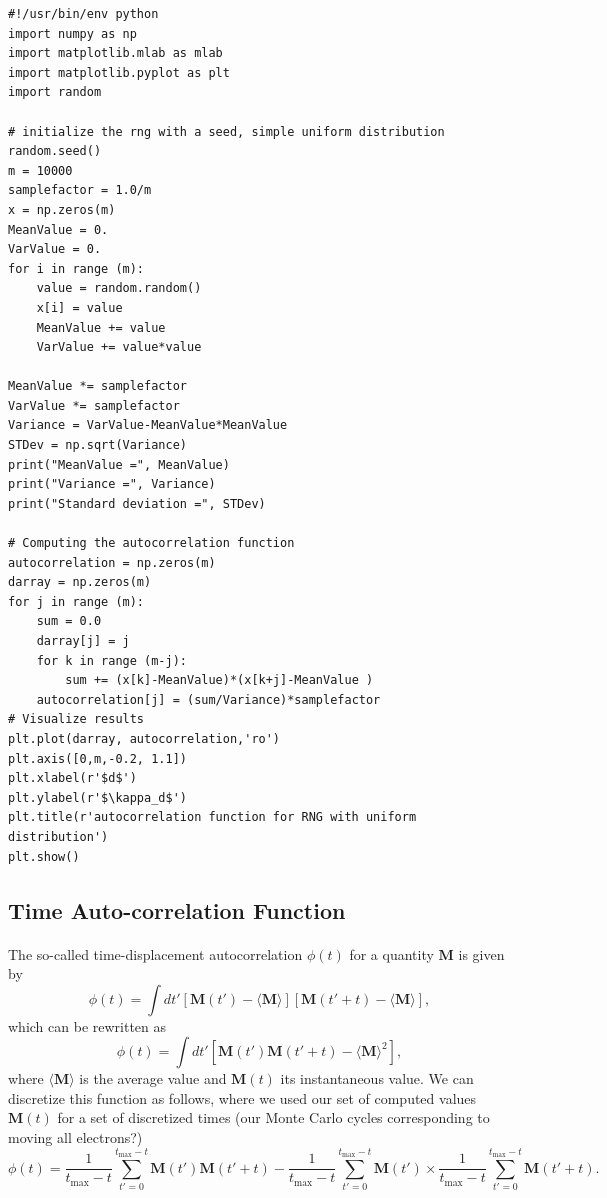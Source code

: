 \documentclass[%
oneside,                 %
final,                   %
10pt]{article}
\begin{document}
\begin{verbatim}
#!/usr/bin/env python
import numpy as np
import matplotlib.mlab as mlab
import matplotlib.pyplot as plt
import random

# initialize the rng with a seed, simple uniform distribution
random.seed() 
m = 10000
samplefactor = 1.0/m
x = np.zeros(m)   
MeanValue = 0.
VarValue = 0.
for i in range (m):
    value = random.random()
    x[i] = value
    MeanValue += value
    VarValue += value*value

MeanValue *= samplefactor
VarValue *= samplefactor
Variance = VarValue-MeanValue*MeanValue
STDev = np.sqrt(Variance)
print("MeanValue =", MeanValue)
print("Variance =", Variance)
print("Standard deviation =", STDev)

# Computing the autocorrelation function
autocorrelation = np.zeros(m)
darray = np.zeros(m)
for j in range (m):
    sum = 0.0
    darray[j] = j
    for k in range (m-j):
        sum += (x[k]-MeanValue)*(x[k+j]-MeanValue ) 
    autocorrelation[j] = (sum/Variance)*samplefactor
# Visualize results
plt.plot(darray, autocorrelation,'ro')
plt.axis([0,m,-0.2, 1.1])
plt.xlabel(r'$d$')
plt.ylabel(r'$\kappa_d$')
plt.title(r'autocorrelation function for RNG with uniform distribution')
plt.show()

\end{verbatim}


\subsection*{Time Auto-correlation Function}

\paragraph{}
The so-called time-displacement autocorrelation $\phi(t)$ for a quantity $\mathbf{M}$ is given by
\[
\phi(t) = \int dt' \left[\mathbf{M}(t')-\langle \mathbf{M} \rangle\right]\left[\mathbf{M}(t'+t)-\langle \mathbf{M} \rangle\right],
\]
which can be rewritten as 
\[
\phi(t) = \int dt' \left[\mathbf{M}(t')\mathbf{M}(t'+t)-\langle \mathbf{M} \rangle^2\right],
\]
where $\langle \mathbf{M} \rangle$ is the average value and
$\mathbf{M}(t)$ its instantaneous value. We can discretize this function as follows, where we used our
set of computed values $\mathbf{M}(t)$ for a set of discretized times (our Monte Carlo cycles corresponding to moving all electrons?)
\[
\phi(t)  = \frac{1}{t_{\mathrm{max}}-t}\sum_{t'=0}^{t_{\mathrm{max}}-t}\mathbf{M}(t')\mathbf{M}(t'+t)
-\frac{1}{t_{\mathrm{max}}-t}\sum_{t'=0}^{t_{\mathrm{max}}-t}\mathbf{M}(t')\times
\frac{1}{t_{\mathrm{max}}-t}\sum_{t'=0}^{t_{\mathrm{max}}-t}\mathbf{M}(t'+t).
\label{eq:phitf}
\]
\end{document}
